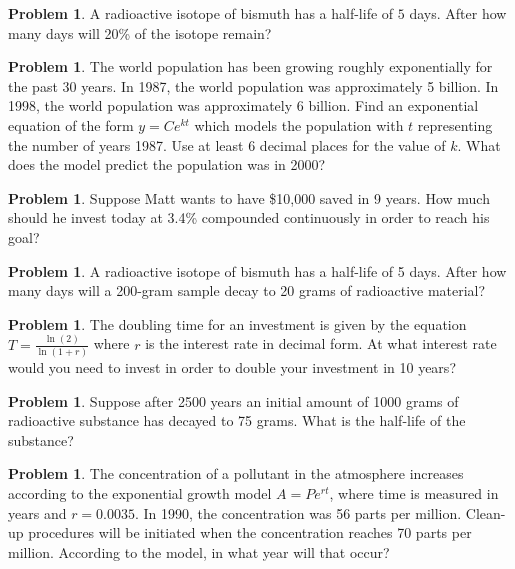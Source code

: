\documentclass[11pt]{scrartcl}
\theoremstyle{definition}
\newtheorem{problem}[theorem]{Problem}
\begin{document}
\begin{problem}
	A radioactive isotope of bismuth has a half-life of $5$ days. After how many days will 20\% of the isotope remain?
\end{problem}



\begin{problem}
	The world population has been growing roughly exponentially for the past 30 years. In 1987, the world population was approximately 5 billion. In 1998, the world population was approximately 6 billion. Find an exponential equation of the form $y=Ce^{kt}$ which models the population with $t$ representing the number of years 1987. Use at least 6 decimal places for the value of $k$. What does the model predict the population was in 2000?
\end{problem}



\begin{problem}
	Suppose Matt wants to have \$10,000 saved in 9 years. How much should he invest today at 3.4\% compounded continuously in order to reach his goal?
\end{problem}



\begin{problem}
	A radioactive isotope of bismuth has a half-life of 5 days. After how many days will a 200-gram sample decay to 20 grams of radioactive material?
\end{problem}



\begin{problem}
	The doubling time for an investment is given by the equation $T=\frac{\ln(2)}{\ln(1+r)}$ where $r$ is the interest rate in decimal form. At what interest rate would you need to invest in order to double your investment in 10 years?
\end{problem}



\begin{problem}
	Suppose after 2500 years an initial amount of 1000 grams of radioactive substance has decayed to 75 grams. What is the half-life of the substance?
\end{problem}



\begin{problem}
	The concentration of a pollutant in the atmosphere increases according to the exponential growth model $A=Pe^{rt}$, where time is measured in years and $r=0.0035$. In 1990, the concentration was 56 parts per million. Clean-up procedures will be initiated when the concentration reaches 70 parts per million. According to the model, in what year will that occur?
\end{problem}
\end{document}
